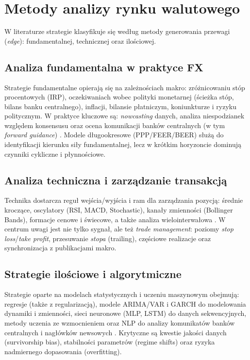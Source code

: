 \section{Metody analizy rynku walutowego}

W literaturze strategie klasyfikuje się według metody generowania przewagi (\emph{edge}): fundamentalnej, technicznej oraz ilościowej.

\subsection{Analiza fundamentalna w praktyce FX}
Strategie fundamentalne opierają się na zależnościach makro: zróżnicowaniu stóp procentowych (IRP), oczekiwaniach wobec polityki monetarnej (ścieżka stóp, bilans banku centralnego), inflacji, bilansie płatniczym, koniunkturze i ryzyku politycznym. W praktyce kluczowe są: \emph{nowcasting} danych, analiza niespodzianek względem konsensusu oraz ocena komunikacji banków centralnych (w tym \emph{forward guidance}) \parencite{mishkin2019}. Modele długookresowe (PPP/FEER/BEER) służą do identyfikacji kierunku siły fundamentalnej, lecz w krótkim horyzoncie dominują czynniki cykliczne i płynnościowe.

\subsection{Analiza techniczna i zarządzanie transakcją}
Technika dostarcza reguł wejścia/wyjścia i ram dla zarządzania pozycją: średnie kroczące, oscylatory (RSI, MACD, Stochastic), kanały zmienności (Bollinger Bands), formacje cenowe i świecowe, a także analiza wielointerwałowa \parencite{murphy1999,elder2014}. W centrum uwagi jest nie tylko sygnał, ale też \emph{trade management}: poziomy \emph{stop loss}/\emph{take profit}, przesuwanie \emph{stopa} (trailing), częściowe realizacje oraz synchronizacja z publikacjami makro.

\subsection{Strategie ilościowe i algorytmiczne}
Strategie oparte na modelach statystycznych i uczeniu maszynowym obejmują: regresje (także z regularizacją), modele ARIMA/VAR i GARCH do modelowania dynamiki i zmienności, sieci neuronowe (MLP, LSTM) do danych sekwencyjnych, metody uczenia ze wzmocnieniem oraz NLP do analizy komunikatów banków centralnych i nagłówków newsowych \parencite{hull2018,chaboud2023}. Krytyczne są kwestie jakości danych (survivorship bias), stabilności parametrów (regime shifts) oraz ryzyka nadmiernego dopasowania (overfitting).

